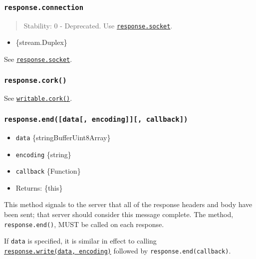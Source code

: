 \subsubsection{\texorpdfstring{\texttt{response.connection}}{response.connection}}\label{response.connection}

\begin{quote}
Stability: 0 - Deprecated. Use
\hyperref[responsesocket]{\texttt{response.socket}}.
\end{quote}

\begin{itemize}
\tightlist
\item
  \{stream.Duplex\}
\end{itemize}

See \hyperref[responsesocket]{\texttt{response.socket}}.

\subsubsection{\texorpdfstring{\texttt{response.cork()}}{response.cork()}}\label{response.cork}

See \href{stream.md\#writablecork}{\texttt{writable.cork()}}.

\subsubsection{\texorpdfstring{\texttt{response.end({[}data{[},\ encoding{]}{]}{[},\ callback{]})}}{response.end({[}data{[}, encoding{]}{]}{[}, callback{]})}}\label{response.enddata-encoding-callback}

\begin{itemize}
\tightlist
\item
  \texttt{data} \{string\textbar Buffer\textbar Uint8Array\}
\item
  \texttt{encoding} \{string\}
\item
  \texttt{callback} \{Function\}
\item
  Returns: \{this\}
\end{itemize}

This method signals to the server that all of the response headers and
body have been sent; that server should consider this message complete.
The method, \texttt{response.end()}, MUST be called on each response.

If \texttt{data} is specified, it is similar in effect to calling
\hyperref[responsewritechunk-encoding-callback]{\texttt{response.write(data,\ encoding)}}
followed by \texttt{response.end(callback)}.

